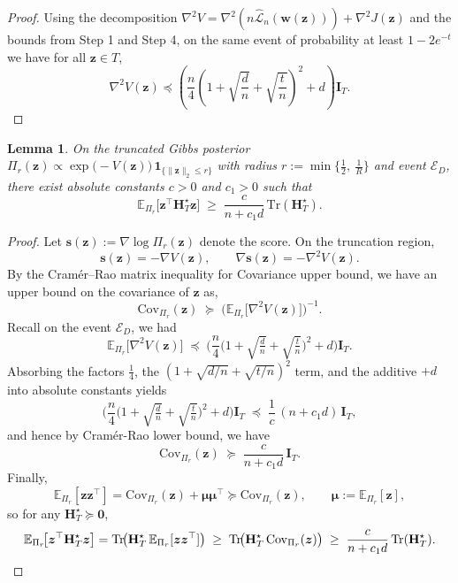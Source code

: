 \documentclass{article}
\theoremstyle{plain}
\newtheorem{lemma}[theorem]{Lemma}
\theoremstyle{definition}
\theoremstyle{remark}
\begin{document}
{\begin{proof}
Using the decomposition $\nabla^2 V = \nabla^2(n\widehat{\mathcal L}_n(\mathbf w(\mathbf z)))+\nabla^2 J(\mathbf z)$ and the bounds from Step 1 and Step 4, on the same event of probability at least $1-2e^{-t}$ we have for all $\mathbf z\in T$,
\[
\nabla^2 V(\mathbf z)
\preceq
\left(
\frac{n}{4}
\left(1+\sqrt{\frac{d}{n}}+\sqrt{\frac{t}{n}}\right)^2
+
d
\right)\mathbf I_T.
\]
\end{proof}


\begin{lemma}
\label{lem:truncated_cov_and_moment}
On the truncated Gibbs posterior $\Pi_r(\boldsymbol z)
\propto
\exp\!\big(-V(\boldsymbol z)\big)\,
\mathbf 1_{\{\|\boldsymbol z\|_2\le r\}}$ with radius $r := \min\Big\{\tfrac12,\ \tfrac{1}{R}\Big\}$ and event $\mathcal{E}_{D}$, there exist absolute constants $c>0$ and $c_1>0$ such that
\[
\mathbb E_{\Pi_r}\!\big[\boldsymbol z^\top \mathbf H_T^\star \boldsymbol z\big]
\;\ge\;
\frac{c}{n+c_1 d}\,\text{Tr}(\mathbf H_T^\star).
\]
\end{lemma}

\begin{proof}
Let $\boldsymbol s(\boldsymbol z):=\nabla \log \Pi_r(\boldsymbol z)$ denote the score.
On the truncation region,
\[
\boldsymbol s(\boldsymbol z)=-\nabla V(\boldsymbol z),
\qquad
\nabla \boldsymbol s(\boldsymbol z)=-\nabla^2 V(\boldsymbol z).
\]
By the Cramér--Rao matrix inequality for Covariance upper bound, we have an upper bound on the covariance of $\mathbf{z}$ as,
\[
\mathrm{Cov}_{\Pi_r}(\boldsymbol z)
\;\succeq\;
\Big(\mathbb E_{\Pi_r}\big[\nabla^2 V(\boldsymbol z)\big]\Big)^{-1}.
\]
Recall on the event $\mathcal{E}_{D}$, we had 
\[
\mathbb E_{\Pi_r}\big[\nabla^2 V(\boldsymbol z)\big]
\;\preceq\;
\Bigg(
\frac{n}{4}
\Big(1+\sqrt{\tfrac{d}{n}}+\sqrt{\tfrac{t}{n}}\Big)^2
+ d
\Bigg)\mathbf I_T .
\]
Absorbing the factors $\frac14$, the $(1+\sqrt{d/n}+\sqrt{t/n})^2$ term, and the additive $+d$
into absolute constants yields
\[
\Bigg(
\frac{n}{4}
\Big(1+\sqrt{\tfrac{d}{n}}+\sqrt{\tfrac{t}{n}}\Big)^2
+ d
\Bigg)\mathbf I_T
\;\preceq\;
\frac{1}{c}\,(n+c_1 d)\,\mathbf I_T,
\]
and hence by Cram\'er-Rao lower bound, we have 
\[
\mathrm{Cov}_{\Pi_r}(\boldsymbol z)
\;\succeq\;
\frac{c}{n+c_1 d}\,\mathbf I_T.
\]
Finally,
\[
\mathbb E_{\Pi_r}[\boldsymbol z\boldsymbol z^\top]
=
\mathrm{Cov}_{\Pi_r}(\boldsymbol z)+\boldsymbol\mu\boldsymbol\mu^\top
\succeq
\mathrm{Cov}_{\Pi_r}(\boldsymbol z),
\qquad
\boldsymbol\mu:=\mathbb E_{\Pi_r}[\boldsymbol z],
\]
so for any $\mathbf H_T^\star\succeq\mathbf 0$,
\[
\mathbb E_{\Pi_r}\!\big[\boldsymbol z^\top \mathbf H_T^\star \boldsymbol z\big]
=
\text{Tr}\!\big(\mathbf H_T^\star\,\mathbb E_{\Pi_r}[\boldsymbol z\boldsymbol z^\top]\big)
\;\ge\;
\text{Tr}\!\big(\mathbf H_T^\star\,\mathrm{Cov}_{\Pi_r}(\boldsymbol z)\big)
\;\ge\;
\frac{c}{n+c_1 d}\,\text{Tr}(\mathbf H_T^\star).
\qedhere
\]
\end{proof}


}
\end{document}
